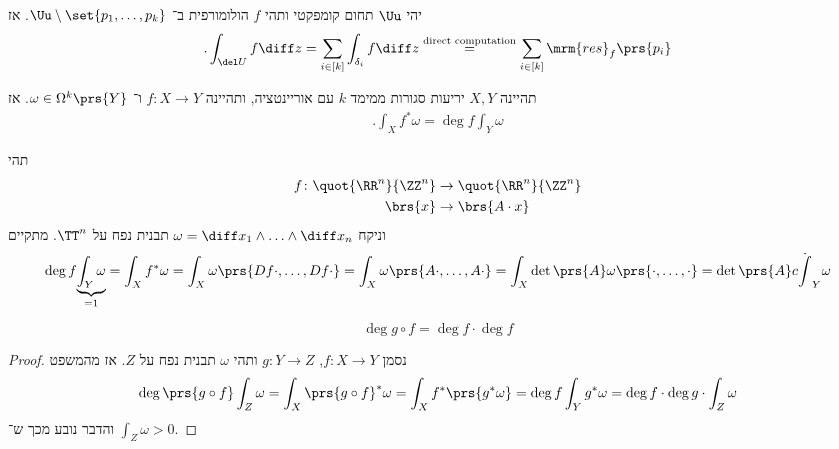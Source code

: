 \documentclass[a4paper,10pt,twoside,openany]{book}
\begin{document}
\begin{enumerate}
\begin{theorem}[השארית]
יהי
$\Uu$
תחום קומפקטי ותהי
$f$
הולומורפית ב־%
$\Uu \setminus \set{p_1, \ldots, p_k}$.
אז
\begin{align*}
\text{.} \int_{\del U} f\diff z = \sum_{i \in [k]} \int_{\delta_i} f\diff z \stackrel{\text{direct computation}}{=} \sum_{i\in[k]} \mrm{res}_f \prs{p_i}
\end{align*}
\end{theorem}
\end{enumerate}

\begin{theorem} \label{map-degree-2}
תהיינה
$X,Y$
יריעות סגורות ממימד
$k$
עם אוריינטציה, ותהיינה
$f \colon X \to Y$
ו־%
$\omega \in \Omega^k\prs{Y}$.
אז
\begin{align*}
\text{.} \int_X f^* \omega = \deg f \int_Y \omega
\end{align*}
\end{theorem}

\begin{example}
תהי
\begin{align*}
f \colon \quot{\RR^n}{\ZZ^n} &\to \quot{\RR^n}{\ZZ^n} \\
\brs{x} &\to \brs{A \cdot x}
\end{align*}
וניקח
$\omega = \diff x_1 \wedge \ldots \wedge \diff x_n$
תבנית נפח על
$\TT^n$.
מתקיים
\begin{align*}
\deg f \underset{=1}{\underbrace{\int_Y \omega}} = \int_X f^* \omega = \int_X \omega \prs{D f \cdot , \ldots, D f \cdot} = \int_X \omega\prs{A \cdot , \ldots, A \cdot} = \int_X \det\prs{A} \omega\prs{\cdot,\ldots,\cdot} = \det\prs{A} c\dot \int_Y \omega
\end{align*}
\end{example}

\begin{corollary}
\[\deg g\circ f = \deg f \cdot \deg f\]
\end{corollary}
\begin{proof}
נסמן
$f \colon X \to Y$, $g \colon Y \to Z$
ותהי
$\omega$
תבנית נפח על
$Z$.
אז מהמשפט
\begin{align*}
\deg\prs{g\circ f} \int_Z \omega = \int_X \prs{g\circ f}^* \omega = \int_X f^* \prs{g^* \omega} = \deg f \int_Y g^* \omega = \deg f \cdot \deg g \cdot \int_Z \omega
\end{align*}
והדבר נובע מכך ש־%
$\int_Z \omega > 0$.
\end{proof}
\end{document}
